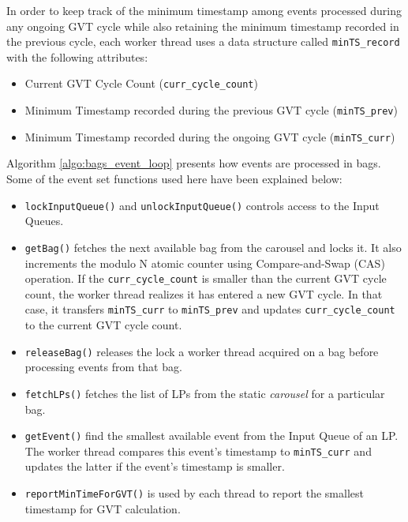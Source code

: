 \documentclass[11pt]{book}
\begin{document}
In order to keep track of the minimum timestamp among events processed during any ongoing GVT cycle while also
retaining the minimum timestamp recorded in the previous cycle, each worker thread uses a data structure
called \texttt{minTS\_record} with the following attributes:

\begin{itemize}

\item Current GVT Cycle Count (\texttt{curr\_cycle\_count})
\item Minimum Timestamp recorded during the previous GVT cycle (\texttt{minTS\_prev})
\item Minimum Timestamp recorded during the ongoing GVT cycle (\texttt{minTS\_curr})

\end{itemize}

Algorithm \ref{algo:bags_event_loop} presents how events are processed in bags.  Some of the event set
functions used here have been explained below:

\begin{itemize}

\item \texttt{lockInputQueue()} and \texttt{unlockInputQueue()} controls access to the Input Queues.

\item \texttt{getBag()} fetches the next available bag from the carousel and locks it.  It also increments the
  modulo N atomic counter using Compare-and-Swap (CAS) operation.  If the \texttt{curr\_cycle\_count} is
  smaller than the current GVT cycle count, the worker thread realizes it has entered a new GVT cycle.  In
  that case, it transfers \texttt{minTS\_curr} to \texttt{minTS\_prev} and updates \texttt{curr\_cycle\_count}
  to the current GVT cycle count.

\item \texttt{releaseBag()} releases the lock a worker thread acquired on a bag before processing events from
  that bag.

\item \texttt{fetchLPs()} fetches the list of LPs from the static \emph{carousel} for a particular bag.

\item \texttt{getEvent()} find the smallest available event from the Input Queue of an LP.  The worker thread
  compares this event's timestamp to \texttt{minTS\_curr} and updates the latter if the event's timestamp is
  smaller.

\item \texttt{reportMinTimeForGVT()} is used by each thread to report the smallest timestamp for GVT
  calculation.

\end{itemize}
\end{document}
